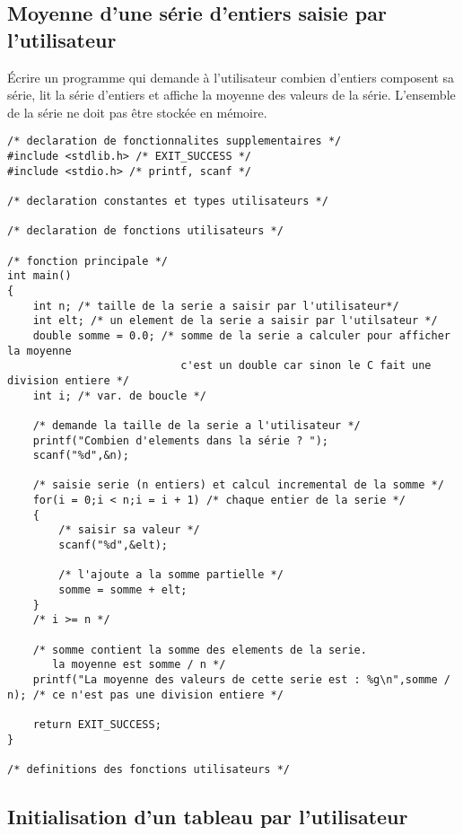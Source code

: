 \subsection{Moyenne d'une série d'entiers saisie par l'utilisateur}

Écrire un programme qui demande à l'utilisateur combien d'entiers composent sa série, lit la série d'entiers et affiche la moyenne des valeurs de la série. L'ensemble de la série ne doit pas être stockée en mémoire. 

\begin{correction}
\begin{verbatim}
/* declaration de fonctionnalites supplementaires */
#include <stdlib.h> /* EXIT_SUCCESS */
#include <stdio.h> /* printf, scanf */

/* declaration constantes et types utilisateurs */

/* declaration de fonctions utilisateurs */

/* fonction principale */
int main()
{
    int n; /* taille de la serie a saisir par l'utilisateur*/
    int elt; /* un element de la serie a saisir par l'utilsateur */
    double somme = 0.0; /* somme de la serie a calculer pour afficher la moyenne 
                           c'est un double car sinon le C fait une division entiere */
    int i; /* var. de boucle */

    /* demande la taille de la serie a l'utilisateur */
    printf("Combien d'elements dans la série ? ");
    scanf("%d",&n);

    /* saisie serie (n entiers) et calcul incremental de la somme */
    for(i = 0;i < n;i = i + 1) /* chaque entier de la serie */
    {
        /* saisir sa valeur */
        scanf("%d",&elt);

        /* l'ajoute a la somme partielle */
        somme = somme + elt;
    }
    /* i >= n */

    /* somme contient la somme des elements de la serie.
       la moyenne est somme / n */
    printf("La moyenne des valeurs de cette serie est : %g\n",somme / n); /* ce n'est pas une division entiere */

    return EXIT_SUCCESS;
}

/* definitions des fonctions utilisateurs */
\end{verbatim}
\end{correction}

\subsection{Initialisation d'un tableau par l'utilisateur}


